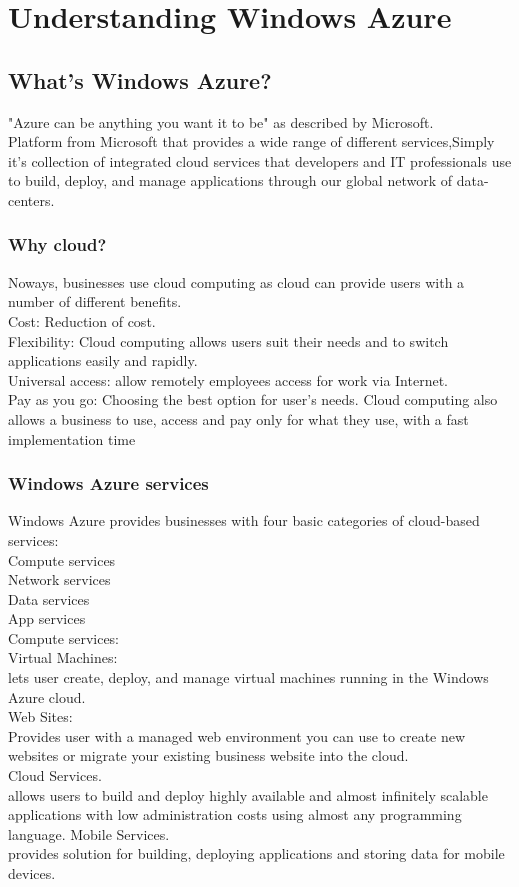 \chapter{Understanding Windows Azure}
\section{What's Windows Azure?}
"Azure can be anything you want it to be" as described by Microsoft.\\
Platform from Microsoft that provides a wide range of different services,Simply it's collection of integrated cloud services that developers and IT professionals use to build, deploy, and manage applications through our global network of data-centers.

\subsection{Why cloud?}
Noways, businesses use cloud computing as cloud can provide users with a number of different benefits.
\\
Cost: Reduction of cost.
\\
Flexibility: Cloud computing allows users suit their needs and to switch applications easily and rapidly. 
\\
Universal access: allow remotely employees access for work via Internet.
\\
Pay as you go: Choosing the best option for user's needs. Cloud computing also allows a business to use, access and pay only for what they use, with a fast implementation time


\subsection{Windows Azure services}
Windows Azure provides businesses with four basic categories of cloud-based services:\\
Compute services\\
Network services\\
Data services\\
App services\\
Compute services:\\
Virtual Machines:\\
lets user create, deploy, and manage virtual machines running in the Windows Azure cloud.\\
Web Sites:\\
Provides user with a managed web environment you can use
to create new websites or migrate your existing business website into the cloud.\\
Cloud Services.\\
allows users to build and deploy highly available and
almost infinitely scalable applications with low administration costs using almost any
programming language.
Mobile Services.\\
provides solution for building, deploying
applications and storing data for mobile devices.